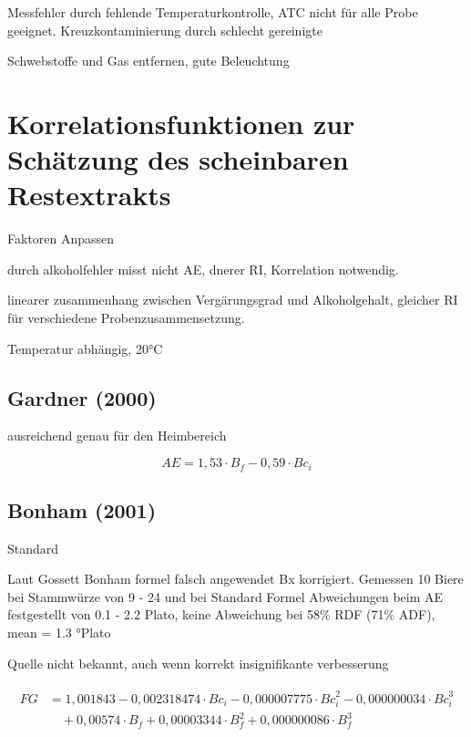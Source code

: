 \documentclass[a4paper,parskip=half]{scrartcl}
\newcommand{\bxic}{\mathit{Bc}_i}
\newcommand{\bxf}{\mathit{B}_f}
\newcommand{\fg}{\mathit{FG}}
\begin{document}
Messfehler durch fehlende Temperaturkontrolle, ATC nicht
für alle Probe geeignet.
Kreuzkontaminierung durch schlecht gereinigte
\autocite{Depalma2017}

Schwebstoffe und Gas entfernen, gute Beleuchtung
\autocite{Gamer1959}

\section*{Korrelationsfunktionen zur Schätzung des scheinbaren Restextrakts}

Faktoren Anpassen
\autocite{Gamer1959}

durch alkoholfehler misst nicht AE, dnerer RI, Korrelation notwendig.
\autocite{Terrill2010a}

linearer zusammenhang zwischen Vergärungsgrad und Alkoholgehalt,
gleicher RI für verschiedene Probenzusammensetzung.
\autocite{Terrill2010}

Temperatur abhängig, 20°C
\autocite{Gossett2012}

\subsection*{Gardner (2000)}

ausreichend genau für den Heimbereich
\autocite{Bonham2001}

\begin{equation}
\mathit{AE}=1,53 \cdot \bxf - 0,59 \cdot \bxic
\label{eq:gardner} 
\end{equation}

\subsection*{Bonham (2001)}

Standard \autocite{Terrill2010a}

Laut Gossett Bonham formel falsch angewendet Bx korrigiert.
Gemessen 10 Biere bei Stammwürze von 9 - 24 und bei Standard Formel Abweichungen
beim AE festgestellt von 0.1 - 2.2 Plato, keine Abweichung bei
58\% RDF (71\% ADF), mean = 1.3 °Plato
\autocite{Terrill2010a}

Quelle nicht bekannt, auch wenn korrekt insignifikante verbesserung
\autocite{Terrill2011}

\autocite{Bonham2001}

\begin{align}
\begin{split}
\fg &= 1,001843 - 0,002318474 \cdot \bxic - 0,000007775 \cdot \bxic^2 -
0,000000034 \cdot \bxic^3 \\
& \quad + 0,00574 \cdot \bxf +
0,00003344 \cdot \bxf^2 + 0,000000086 \cdot \bxf^3
\end{split} \label{eq:bonham} 
\end{align}
\end{document}
